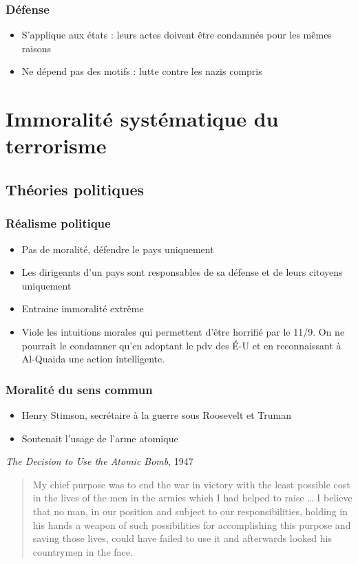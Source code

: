 \documentclass[english, french]{beamer}
\begin{document}
\begin{frame}
  \frametitle{Défense}
  \begin{itemize}
    \item S’applique aux états : leurs actes doivent être condamnés pour les mêmes raisons
    \item Ne dépend pas des motifs : lutte contre les nazis compris
  \end{itemize}
\end{frame}

\section{Immoralité systématique du terrorisme}
\subsection{Théories politiques}
\begin{frame}
  \frametitle{Réalisme politique}
  \begin{itemize}
    \item Pas de moralité, défendre le pays uniquement
    \item Les dirigeants d’un pays sont responsables de sa défense et de leurs citoyens uniquement
    \item Entraine immoralité extrême
    \item Viole les intuitions morales qui permettent d’être horrifié par le 11/9. On ne pourrait le condamner qu’en adoptant le pdv des É-U et en reconnaissant à Al-Quaida une action intelligente.
  \end{itemize}
\end{frame}

\begin{frame}
  \frametitle{Moralité du sens commun}
  \begin{itemize}
    \item Henry Stimson, secrétaire à la guerre sous Roosevelt et Truman
    \item Soutenait l’usage de l’arme atomique
  \end{itemize}
  \emph{The Decision to Use the Atomic Bomb}, 1947
  \begin{quote}
    My chief purpose was to end the war in victory with the least possible cost in the lives of the men in the armies which I had helped to raise … I believe that no man, in our position and subject to our responsibilities, holding in his hands a weapon of such possibilities for accomplishing this purpose and saving those lives, could have failed to use it and afterwards looked his countrymen in the face.
  \end{quote}
\end{frame}
\end{document}
